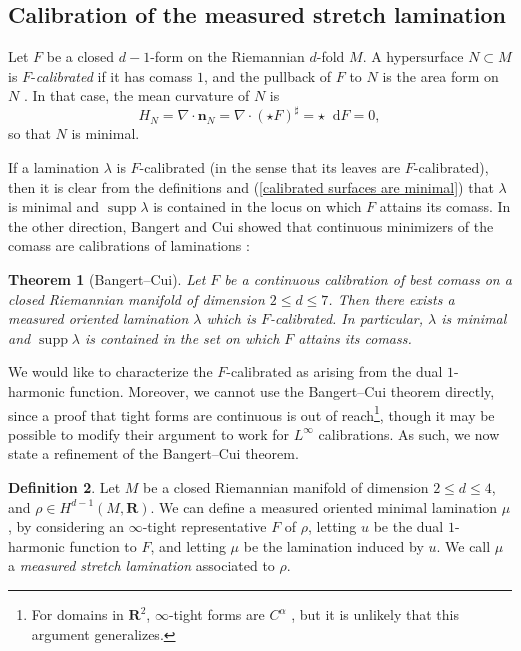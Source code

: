 \documentclass[reqno,11pt]{amsart}
\newcommand{\RR}{\mathbf{R}}
\newcommand*\dif{\mathop{}\!\mathrm{d}}
\DeclareMathOperator{\supp}{supp}
\newcommand{\normal}{\mathbf n}
\newcommand{\dfn}[1]{\emph{#1}\index{#1}}
\newtheorem{theorem}{Theorem}[section]
\theoremstyle{definition}
\newtheorem{definition}[theorem]{Definition}
\numberwithin{equation}{section}
\begin{document}

\subsection{Calibration of the measured stretch lamination}
Let $F$ be a closed $d-1$-form on the Riemannian $d$-fold $M$.
A hypersurface $N \subset M$ is $F$-\dfn{calibrated} if it has comass $1$, and the pullback of $F$ to $N$ is the area form on $N$ \cite{Harvey82}.
In that case, the mean curvature of $N$ is 
\begin{equation}\label{calibrated surfaces are minimal}
H_N = \nabla \cdot \normal_N = \nabla \cdot (\star F)^\sharp = \star \dif F = 0,
\end{equation}
so that $N$ is minimal. 

If a lamination $\lambda$ is $F$-calibrated (in the sense that its leaves are $F$-calibrated), then it is clear from the definitions and (\ref{calibrated surfaces are minimal}) that $\lambda$ is minimal and $\supp \lambda$ is contained in the locus on which $F$ attains its comass.
In the other direction, Bangert and Cui showed that continuous minimizers of the comass are calibrations of laminations \cite{bangert_cui_2017}:

\begin{theorem}[Bangert--Cui]
Let $F$ be a continuous calibration of best comass on a closed Riemannian manifold of dimension $2 \leq d \leq 7$.
Then there exists a measured oriented lamination $\lambda$ which is $F$-calibrated.
In particular, $\lambda$ is minimal and $\supp \lambda$ is contained in the set on which $F$ attains its comass.
\end{theorem}

We would like to characterize the $F$-calibrated as arising from the dual $1$-harmonic function.
Moreover, we cannot use the Bangert--Cui theorem directly, since a proof that tight forms are continuous is out of reach\footnote{For domains in $\RR^2$, $\infty$-tight forms are $C^\alpha$ \cite{Evans08}, but it is unlikely that this argument generalizes.}, though it may be possible to modify their argument to work for $L^\infty$ calibrations.
As such, we now state a refinement of the Bangert--Cui theorem.

\begin{definition}
Let $M$ be a closed Riemannian manifold of dimension $2 \leq d \leq 4$, and $\rho \in H^{d - 1}(M, \RR)$.
We can define a measured oriented minimal lamination $\mu$, by considering an $\infty$-tight representative $F$ of $\rho$, letting $u$ be the dual $1$-harmonic function to $F$, and letting $\mu$ be the lamination induced by $u$.
We call $\mu$ a \dfn{measured stretch lamination} associated to $\rho$.
\end{definition}
\end{document}
